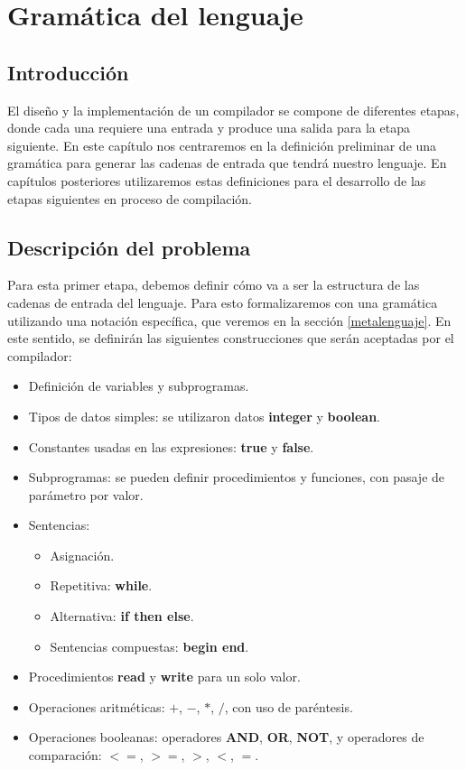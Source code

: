 \chapter{Gramática del lenguaje}

\section{Introducción}
El diseño y la implementación de un compilador se compone de diferentes etapas, donde cada una requiere una entrada y produce una salida para la etapa siguiente. En este capítulo nos centraremos en la definición preliminar de una gramática para generar las cadenas de entrada que tendrá nuestro lenguaje. En capítulos posteriores utilizaremos estas definiciones para el desarrollo de las etapas siguientes en proceso de compilación.

\section{Descripción del problema}
\label{desc_problema}
Para esta primer etapa, debemos definir cómo va a ser la estructura de las cadenas de entrada del lenguaje. Para esto formalizaremos con una gramática utilizando una notación específica, que veremos en la sección \ref{metalenguaje}. En este sentido, se definirán las siguientes construcciones que serán aceptadas por el compilador:
\begin{itemize}
\item Definición de variables y subprogramas.
\item Tipos de datos simples: se utilizaron datos \textbf{integer} y \textbf{boolean}.
\item Constantes usadas en las expresiones: \textbf{true} y \textbf{false}.
\item Subprogramas: se pueden definir procedimientos y funciones, con pasaje de parámetro por valor.
\item Sentencias:

\begin{itemize}
\item Asignación.
\item Repetitiva: \textbf{while}.
\item Alternativa: \textbf{if then else}.
\item Sentencias compuestas: \textbf{begin end}.
\end{itemize}

\item Procedimientos \textbf{read} y \textbf{write} para un solo valor.
\item Operaciones aritméticas: $+$, $-$, $*$, $/$, con uso de paréntesis. 
\item Operaciones booleanas: operadores \textbf{AND}, \textbf{OR}, \textbf{NOT}, y operadores de comparación: $<=$, $>=$, $>$, $<$, $=$.
\end{itemize}


